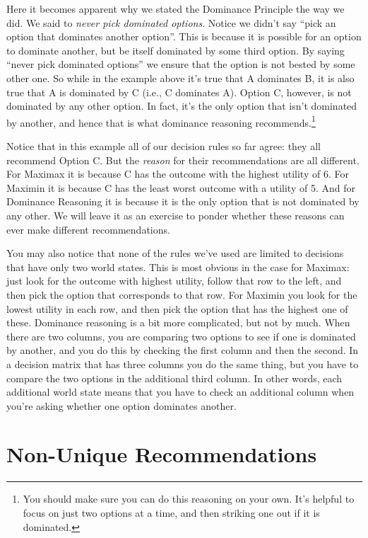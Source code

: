 \documentclass[]{tufte-book}
\begin{document}
Here it becomes apparent why we stated the Dominance Principle the way we did. We said to \emph{never pick dominated options}. Notice we didn't say ``pick an option that dominates another option''. This is because it is possible for an option to dominate another, but be itself dominated by some third option. By saying ``never pick dominated options'' we ensure that the option is not bested by some other one. So while in the example above it's true that A dominates B, it is also true that A is dominated by C (i.e., C dominates A). Option C, however, is not dominated by any other option. In fact, it's the only option that isn't dominated by another, and hence that is what dominance reasoning recommends.\footnote{You should make sure you can do this reasoning on your own. It's helpful to focus on just two options at a time, and then striking one out if it is dominated.}

Notice that in this example all of our decision rules so far agree: they all recommend Option C. But the \emph{reason} for their recommendations are all different. For Maximax it is because C has the outcome with the highest utility of 6. For Maximin it is because C has the least worst outcome with a utility of 5. And for Dominance Reasoning it is because it is the only option that is not dominated by any other. We will leave it as an exercise to ponder whether these reasons can ever make different recommendations.

You may also notice that none of the rules we've used are limited to decisions that have only two world states. This is most obvious in the case for Maximax: just look for the outcome with highest utility, follow that row to the left, and then pick the option that corresponds to that row. For Maximin you look for the lowest utility in each row, and then pick the option that has the highest one of these. Dominance reasoning is a bit more complicated, but not by much. When there are two columns, you are comparing two options to see if one is dominated by another, and you do this by checking the first column and then the second. In a decision matrix that has three columns you do the same thing, but you have to compare the two options in the additional third column. In other words, each additional world state means that you have to check an additional column when you're asking whether one option dominates another.

\hypertarget{non-unique-recommendations}{%
\section{Non-Unique Recommendations}\label{non-unique-recommendations}}
\end{document}
